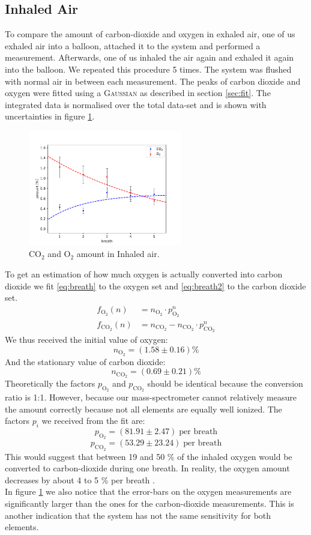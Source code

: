    \newpage
    \subsection{Inhaled Air}
    To compare the amount of carbon-dioxide and oxygen in exhaled air, one of us exhaled air into a balloon, attached it to the system and performed a measurement. Afterwards, one of us inhaled the air again and exhaled it again into the balloon. We repeated this procedure 5 times. The system was flushed with normal air in between each measurement. The peaks of carbon dioxide and oxygen were fitted using a {\scshape Gaussian} as described in section \ref{sec:fit}. The integrated data is normalised over the total data-set and is shown with uncertainties in figure \ref{fig:air}. 
    \begin{figure}[h!]
        \centering
        \includegraphics[width=0.6\textwidth]{Report/DataResultsPlots/air.pdf}
        \caption{CO$_2$ and O$_2$ amount in Inhaled air.}
        \label{fig:air}
    \end{figure}
    To get an estimation of how much oxygen is actually converted into carbon dioxide we fit \eqref{eq:breath} to the oxygen set and \eqref{eq:breath2} to the carbon dioxide set.
    \begin{align}
        f_{\text{O}_2}(n) &= n_{\text{O}_2} \cdot p_{\text{O}_2}^n \label{eq:breath}\\
        f_{\text{CO}_2}(n) &= n_{\text{CO}_2} - n_{\text{CO}_2} \cdot p_{\text{CO}_2}^n \label{eq:breath2}
    \end{align}
    We thus received the initial value of oxygen:
    $$ n_{\text{O}_2} = (1.58 \pm 0.16) \%$$
    And the stationary value of carbon dioxide:
    $$ n_{\text{CO}_2} = (0.69 \pm 0.21) \%$$
    Theoretically the factors $p_{\text{O}_2}$ and $p_{\text{CO}_2}$ should be identical because the conversion ratio is 1:1. However, because our mass-spectrometer cannot relatively measure the amount correctly because not all elements are equally well ionized. The factors $p_i$ we received from the fit are:
    $$p_{\text{O}_2} = (81.91 \pm 2.47) \;\text{per breath}$$
    $$p_{\text{CO}_2} = (53.29 \pm 23.24) \;\text{per breath}$$
    This would suggest that between 19 and 50 \% of the inhaled oxygen would be converted to carbon-dioxide during one breath.
    In reality, the oxygen amount decreases by about 4 to 5 \% per breath \cite{breath}.\\
    In figure \ref{fig:air} we also notice that the error-bars on the oxygen measurements are significantly larger than the ones for the carbon-dioxide measurements. This is another indication that the system has not the same sensitivity for both elements.
    
